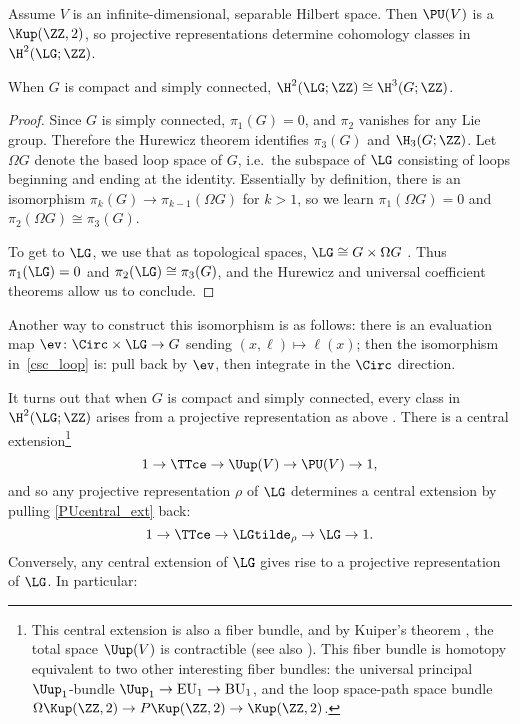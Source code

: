 Assume $V$ is an infinite-dimensional, separable Hilbert space. Then $\PU(V)$ is a $\Kup(\ZZ, 2)$, so
projective representations determine cohomology classes in $\H^2(\LG;\ZZ)$.
\begin{lem}
\label{csc_loop}
When $G$ is compact and simply connected, $\H^2(\LG;\ZZ)\cong\H^3(G;\ZZ)$.
\end{lem}
\begin{proof}
Since $G$ is simply connected, $\pi_1(G) = 0$, and $\pi_2$ vanishes for any Lie group. Therefore the Hurewicz
theorem identifies $\pi_3(G)$ and $\H_3(G;\ZZ)$. Let $\Omega G$ denote the based loop space of
$G$, i.e.\ the subspace of $\LG$ consisting of loops beginning and ending at the
identity. Essentially by definition, there is an isomorphism $\pi_k(G)\to\pi_{k-1}(\Omega G)$ for $k > 1$, so we
learn $\pi_1(\Omega G) = 0$ and $\pi_2(\Omega G)\cong\pi_3(G)$.

To get to $\LG$, we use that as topological spaces, $\LG\cong G\times\Omega G$ \cite[\S 4.4]{loop}. Thus
$\pi_1(\LG) = 0$ and $\pi_2(\LG) \cong \pi_3(G)$, and the Hurewicz and universal coefficient theorems allow us to
conclude.
\end{proof}
Another way to construct this isomorphism is as follows: there is an evaluation map $\ev\colon
\Circ\times\LG\to G$ sending $(x, \ell)\mapsto\ell(x)$; then the isomorphism in~\cref{csc_loop} is: pull back by
$\ev$, then integrate in the $\Circ$ direction.

It turns out that when $G$ is compact and simply connected, every class in $\H^2(\LG;\ZZ)$ arises from a projective
representation as above \cite[Theorem 4.4.1]{loop}. There is a central extension\footnote{This central extension is
also a fiber bundle, and by Kuiper's theorem \cite{Kui65}, the total space $\Uup(V)$ is contractible (see
also \cites[Lemme 3]{DD63}[Proposition A2.1]{AS04}). This fiber bundle is
homotopy equivalent to two other interesting fiber bundles: the universal principal $\Uup_1$-bundle
$\Uup_1\to\mathrm{EU}_1\to\mathrm{BU}_1$, and the loop space-path space bundle $\Omega \Kup(\ZZ, 2)\to P
\Kup(\ZZ, 2)\to \Kup(\ZZ, 2)$.}
\begin{equation}
\label{PUcentral_ext}
	1\to \TTce\to \Uup(V)\to \PU(V)\to 1,
\end{equation}
and so any projective representation $\rho$ of $\LG$ determines a central
extension by pulling \eqref{PUcentral_ext} back:
\begin{equation}
	1\to \TTce\to \LGtilde_\rho \to \LG \to 1.
\end{equation}
Conversely, any central extension of $\LG$ gives rise to a projective
representation of $\LG$. In particular:

